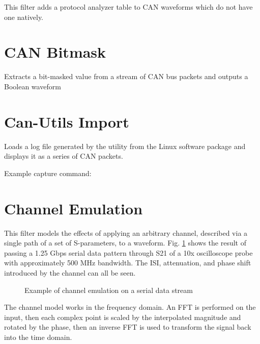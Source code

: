 This filter adds a protocol analyzer table to CAN waveforms which do not have one natively.

\pagebreak
\section{CAN Bitmask}
\label{filter:canbitmask}

Extracts a bit-masked value from a stream of CAN bus packets and outputs a Boolean waveform

\pagebreak
\section{Can-Utils Import}

Loads a log file generated by the  utility from the Linux  software package and
displays it as a series of CAN packets.

Example capture command: 

\pagebreak
\section{Channel Emulation}
\label{filter:channelemu}

This filter models the effects of applying an arbitrary channel, described via a single path of a set of S-parameters,
to a waveform. Fig. \ref{filter_channelemu} shows the result of passing a 1.25 Gbps serial data pattern through S21 of
a 10x oscilloscope probe with approximately 500 MHz bandwidth. The ISI, attenuation, and phase shift introduced by the
channel can all be seen.

\begin{figure}[h]
\centering
{}
\caption{Example of channel emulation on a serial data stream}
\label{filter_channelemu}
\end{figure}

The channel model works in the frequency domain. An FFT is performed on the input, then each complex point is scaled by
the interpolated magnitude and rotated by the phase, then an inverse FFT is used to transform the signal back into the
time domain.

